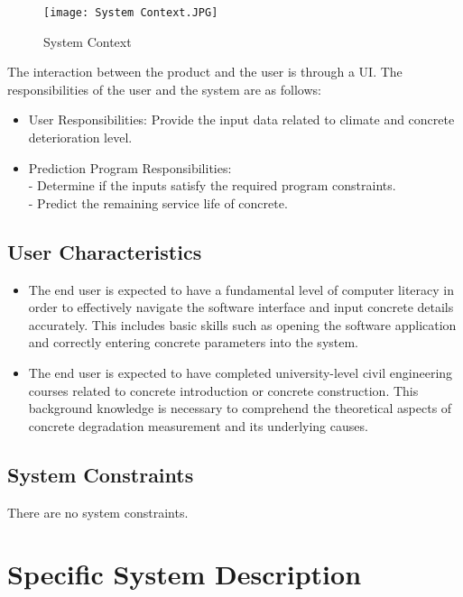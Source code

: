 \documentclass[12pt]{article}
\begin{document}
\begin{figure}
    \centering
    \texttt{[image: System Context.JPG]}
    \caption{System Context}
    \label{fig:syscon}
\end{figure}

The interaction between the product and the user is through a UI. The responsibilities of the user and the system are as follows: 

\begin{itemize}
\item User Responsibilities: Provide the input data related to climate and concrete deterioration level.
\end{itemize}
\begin{itemize}
\item Prediction Program Responsibilities: \\
    - Determine if the inputs satisfy the required program constraints.\\
    - Predict the remaining service life of concrete. \\
\end{itemize}

\subsection{User Characteristics} \label{SecUserCharacteristics}
\begin{itemize}
\item The end user is expected to have a fundamental level of computer literacy in order to effectively navigate the software interface and input concrete details accurately. This includes basic skills such as opening the software application and correctly entering concrete parameters into the system.
\item The end user is expected to have completed university-level civil engineering courses related to concrete introduction or concrete construction. This background knowledge is necessary to comprehend the theoretical aspects of concrete degradation measurement and its underlying causes.
\end{itemize}

\subsection{System Constraints}

There are no system constraints.

\section{Specific System Description}
\end{document}
